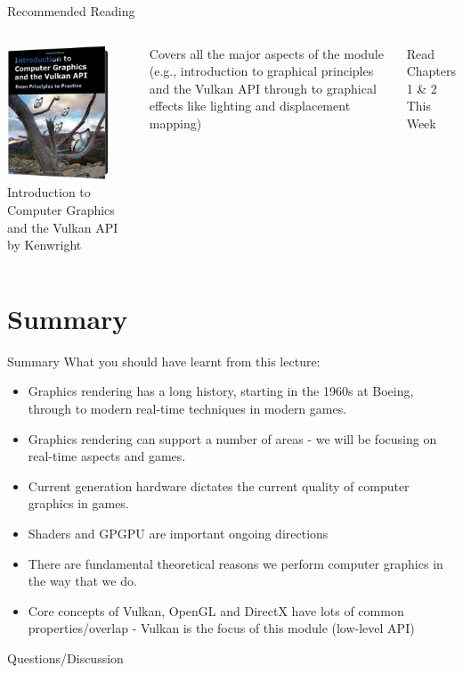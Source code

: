 \documentclass[handout,18pt]{beamer}
\begin{document}
\begin{frame}{Recommended Reading}
\begin{columns}
\centering
\includegraphics[height=4cm]{book}
Introduction to Computer Graphics and the Vulkan API by Kenwright

\vspace{11pt}
Covers all the major aspects of the module (e.g., introduction to graphical principles and the Vulkan API through to graphical effects like lighting and displacement mapping)

\vspace{11pt}
Read Chapters 1 \& 2 This Week
\end{columns}
\end{frame}




\section{Summary}

\begin{frame}{Summary}
What you should have learnt from this lecture:
\begin{itemize}
\pause \item Graphics rendering has a long history, starting in 
the 1960s at Boeing, through to modern real-time techniques in
modern games.
\pause \item Graphics rendering can support a number of areas - we 
will be focusing on real-time aspects and games.
\pause \item Current generation hardware dictates the current 
quality of computer graphics in games.
\pause \item Shaders and GPGPU are important ongoing directions
\pause \item There are fundamental theoretical reasons we perform
computer graphics in the way that we do.
\pause \item Core concepts of Vulkan, OpenGL and DirectX have lots of common properties/overlap
- Vulkan is the focus of this module (low-level API)
\end{itemize}
\pause

\end{frame}




\begin{frame}{Questions/Discussion}

\end{frame}
\end{document}

